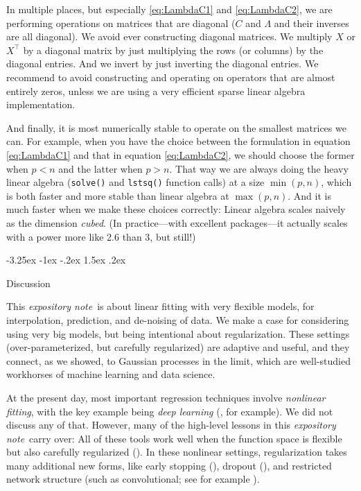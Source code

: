 \documentclass[12pt,letterpaper]{article}
\makeatletter
\renewcommand\section{\@startsection {section}{1}{\z@}%
  {-3.25ex \@plus -1ex \@minus -.2ex}%
  {1.5ex \@plus .2ex}%
  {\raggedright\normalfont\large\bfseries}}
\newcommand{\documentname}{\textsl{expository note}}
\newcommand{\code}[1]{\texttt{#1}}
\makeatother
\begin{document}
In multiple places, but especially \eqref{eq:LambdaC1} and \eqref{eq:LambdaC2}, we are performing operations on matrices that are diagonal ($C$ and $\Lambda$ and their inverses are all diagonal).
We avoid ever constructing diagonal matrices.
We multiply $X$ or $X^\top$ by a diagonal matrix by just multiplying the rows (or columns) by the diagonal entries.
And we invert by just inverting the diagonal entries.
We recommend to avoid constructing and operating on operators that are almost entirely zeros, unless we are using a very efficient sparse linear algebra implementation.

And finally, it is most numerically stable to operate on the smallest matrices we can.
For example, when you have the choice between the formulation in equation \eqref{eq:LambdaC1} and that in equation \eqref{eq:LambdaC2}, we should choose the former when $p<n$ and the latter when $p>n$.
That way we are always doing the heavy linear algebra (\code{solve()} and \code{lstsq()} function calls) at a size $\min(p, n)$, which is both faster and more stable than linear algebra at $\max(p, n)$. And it is much faster when we make these choices correctly:
Linear algebra scales naively as the dimension \emph{cubed}.
(In practice---with excellent packages---it actually scales with a power more like 2.6 than 3, but still!)

\section{Discussion}\label{sec:discussion}

This \documentname\ is about linear fitting with very flexible models, for interpolation, prediction, and de-noising of data.
We make a case for considering using very big models, but being intentional about regularization.
These settings (over-parameterized, but carefully regularized) are adaptive and useful, and they connect, as we showed, to Gaussian processes in the limit, which are well-studied workhorses of machine learning and data science.

At the present day, most important regression techniques involve \emph{nonlinear fitting}, with the key example being \emph{deep learning} (\citealt{deep}, for example).
We did not discuss any of that.
However, many of the high-level lessons in this \documentname\ carry over:
All of these tools work well when the function space is flexible but also carefully regularized (\citealt{belkin2019reconciling}).
In these nonlinear settings, regularization takes many additional new forms, like early stopping (\citealt{earlystop}), dropout (\citealt{dropout}), and restricted network structure (such as convolutional; see for example \citealt{bishop}).
\end{document}
